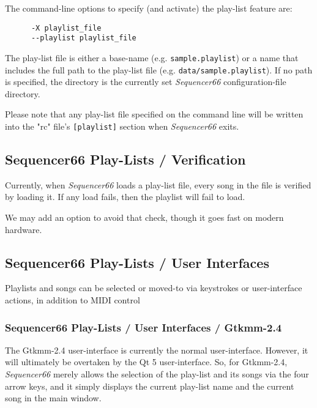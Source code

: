    The command-line options to specify (and activate) the play-list feature
   are:

   \begin{verbatim}
      -X playlist_file
      --playlist playlist_file
   \end{verbatim}

   The play-list file is either a base-name (e.g. \texttt{sample.playlist})
   or a name that includes the full path to the play-list file
   (e.g. \texttt{data/sample.playlist}).
   If no path is specified, the directory is the currently set
   \textsl{Sequencer66} configuration-file directory.

   Please note that any play-list file specified on the command line
   will be written into the "rc" file's \texttt{[playlist]} section when
   \textsl{Sequencer66} exits.

\subsection{Sequencer66 Play-Lists / Verification}
\label{subsec:playlist_verify}

   Currently, when \textsl{Sequencer66} loads a play-list file, every
   song in the file is verified by loading it.  If any load fails, then
   the playlist will fail to load.

   We may add an option to avoid that check, though it goes fast on
   modern hardware.

\subsection{Sequencer66 Play-Lists / User Interfaces}
\label{subsec:playlist_uis}

   Playlists and songs can be selected or moved-to via keystrokes or
   user-interface actions, in addition to MIDI control

\subsubsection{Sequencer66 Play-Lists / User Interfaces / Gtkmm-2.4}
\label{subsubsec:playlist_ui_gtk}

   The Gtkmm-2.4 user-interface is currently the normal user-interface.
   However, it will ultimately be overtaken by the Qt 5 user-interface.
   So, for Gtkmm-2.4, \textsl{Sequencer66} merely allows the selection of the
   play-list and its songs via the four arrow keys, and it simply displays the
   current play-list name and the current song in the main window.

